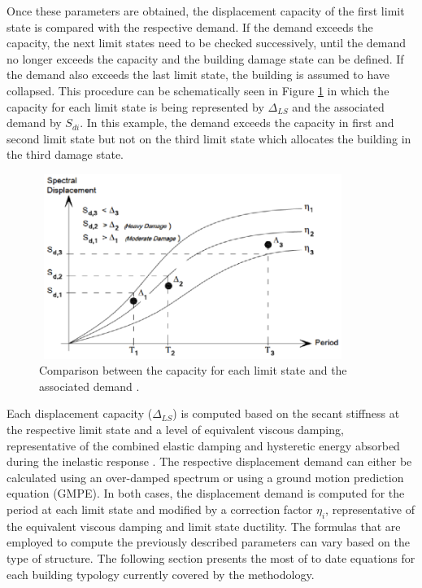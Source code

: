 Once these parameters are obtained, the displacement capacity of the first limit state is compared with the respective demand. If the demand exceeds the capacity, the next limit states need to be checked successively, until the demand no longer exceeds the capacity and the building damage state can be defined. If the demand also exceeds the last limit state, the building is assumed to have collapsed. This procedure can be schematically seen in Figure \ref{fig:dbela_procedure} in which the capacity for each limit state is being represented by $\Delta_{LS}$ and the associated demand by $S_{di}$. In this example, the demand exceeds the capacity in first and second limit state but not on the third limit state which allocates the building in the third damage state.

\begin{figure}[ht]
\centering
\includegraphics[width=10cm,height=6cm]{./Figures/Part_Risk/dbela_procedure.eps}
\caption{Comparison between the capacity for each limit state and the associated demand \citep{Baletal2010}.}
\label{fig:dbela_procedure}
\end{figure}

Each displacement capacity ($\Delta_{LS}$) is computed based on the secant stiffness at the respective limit state and a level of equivalent viscous damping, representative of the combined elastic damping and hysteretic energy absorbed during the inelastic response \citep{Baletal2010}. The respective displacement demand can either be calculated using an over-damped spectrum or using a ground motion prediction equation (GMPE). In both cases, the displacement demand is computed for the period at each limit state and modified by a correction factor $\eta_i$, representative of the equivalent viscous damping and limit state ductility. The formulas that are employed to compute the previously described parameters can vary based on the type of structure. The following section presents the most of to date equations for each building typology currently covered by the methodology.

